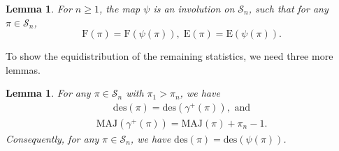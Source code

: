 \documentclass[12pt]{amsart}
\numberwithin{equation}{section}
\theoremstyle{plain}
\newtheorem{lemma}[theorem]{Lemma}
\theoremstyle{definition}
\def\MAJ{\mathrm{MAJ}}
\def\F{\mathrm{F}}
\def\L{\mathrm{E}}
\def\des{\mathrm{des}}
\def\SS{\mathcal{S}}
\begin{document}
\begin{lemma}\label{psi:F-L}
For $n\ge 1$, the map $\psi$ is an involution on $\SS_n$, such that for any $\pi\in\SS_n$,
$$\F(\pi)=\F(\psi(\pi)),\; \L(\pi)=\L(\psi(\pi)).$$
\end{lemma}

To show the equidistribution of the remaining statistics, we need three more lemmas.

\begin{lemma}\label{psi:des}
For any $\pi\in\SS_n$ with $\pi_1>\pi_n$, we have
\begin{align}\label{gamma:des}
\des(\pi)=\des(\gamma^{+}(\pi)), \text{ and}
\end{align}
\begin{align}\label{gamma:MAJ}
\MAJ(\gamma^+(\pi))=\MAJ(\pi)+\pi_n-1.
\end{align}
Consequently, for any $\pi\in\SS_n$, we have $\des(\pi)=\des(\psi(\pi))$.
\end{lemma}
\end{document}
